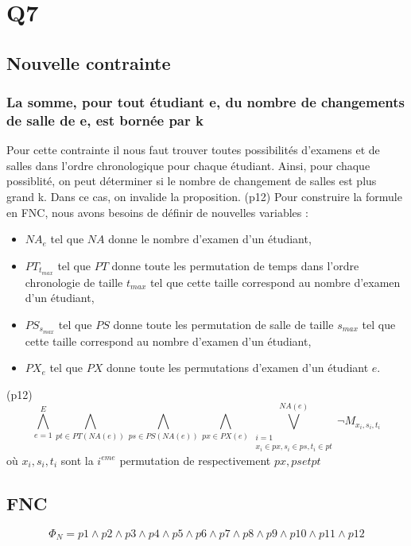 \documentclass[a4paper,11pt]{article}
\begin{document}
\section{Q7}
\subsection{Nouvelle contrainte}
\subsubsection{La somme, pour tout étudiant e, du nombre de changements de salle de e, est bornée par k}
Pour cette contrainte il nous faut trouver toutes possibilités d'examens et de salles dans l'ordre chronologique pour chaque étudiant. Ainsi, pour chaque possiblité, on peut déterminer si le nombre de changement de salles est plus grand k. Dans ce cas, on invalide la proposition.
(p12)
Pour construire la formule en FNC, nous avons besoins de définir de nouvelles variables :  
\begin{itemize}
	\item \( NA_{e}\) tel que $NA$ donne le nombre d'examen d'un étudiant,
	\item \( PT_{t_{max}}\) tel que $PT$ donne toute les permutation de temps dans l'ordre chronologie de taille $t_{max}$ tel que cette taille correspond au nombre d'examen d'un étudiant,
	\item \( PS_{s_{max}}\) tel que $PS$ donne toute les permutation de salle de taille $s_{max}$ tel que cette taille correspond au nombre d'examen d'un étudiant,
	\item \( PX_{e}\) tel que $PX$ donne toute les permutations d'examen d'un étudiant $e$.
\end{itemize}

(p12)
\begin{displaymath}
	\bigwedge\limits_{e=1}^{E}
	\bigwedge\limits_{pt \in PT(NA(e))}^{}
	\bigwedge\limits_{ps \in PS(NA(e))}^{}
	\bigwedge\limits_{px \in PX(e)}^{}
	\bigvee\limits_{\substack{i=1 \\ x_{i} \in px, s_{i} \in ps, t_{i} \in pt }}^{NA(e)} 
	\neg M_{x_{i}, s_{i}, t_{i}}
\end{displaymath}
où $ x_{i}, s_{i}, t_{i} $ sont la $i^{eme}$ permutation de respectivement $ px, ps et pt $

\subsection{FNC}
\begin{displaymath}
	\Phi_{N} = p1 \wedge p2 \wedge p3 \wedge p4 \wedge p5 \wedge p6 \wedge p7 \wedge p8 \wedge p9 \wedge p10 \wedge p11 \wedge p12
\end{displaymath}
	
\end{document}
